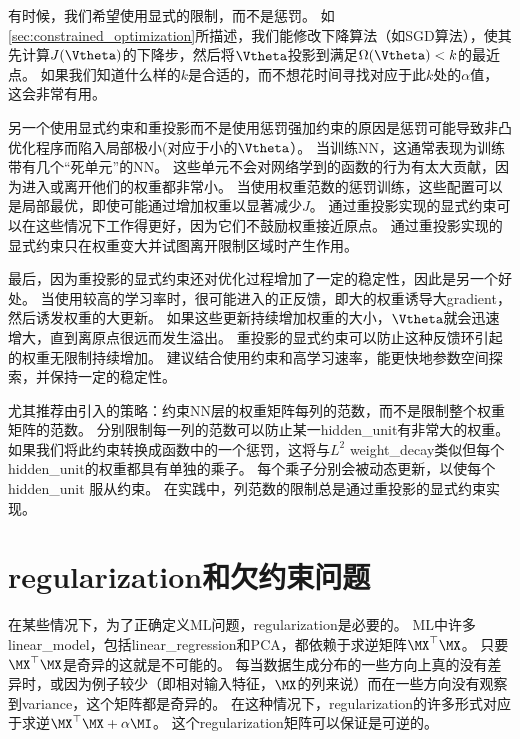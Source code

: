 
有时候，我们希望使用显式的限制，而不是惩罚。
如\ref{sec:constrained_optimization}所描述，我们能修改下降算法（如\gls{SGD}算法），使其先计算$J(\Vtheta)$的下降步，然后将$\Vtheta$投影到满足$\Omega(\Vtheta) < k$的最近点。
如果我们知道什么样的$k$是合适的，而不想花时间寻找对应于此$k$处的$\alpha$值，这会非常有用。

另一个使用显式约束和重投影而不是使用惩罚强加约束的原因是惩罚可能导致非凸优化程序而陷入局部极小(对应于小的$\Vtheta$）。
当训练\gls{NN}，这通常表现为训练带有几个``死单元''的\gls{NN}。
这些单元不会对网络学到的函数的行为有太大贡献，因为进入或离开他们的权重都非常小。
当使用权重范数的惩罚训练，这些配置可以是局部最优，即使可能通过增加权重以显著减少$J$。
通过重投影实现的显式约束可以在这些情况下工作得更好，因为它们不鼓励权重接近原点。
通过重投影实现的显式约束只在权重变大并试图离开限制区域时产生作用。

最后，因为重投影的显式约束还对优化过程增加了一定的稳定性，因此是另一个好处。
当使用较高的学习率时，很可能进入的正反馈，即大的权重诱导大\gls{gradient}，然后诱发权重的大更新。
如果这些更新持续增加权重的大小，$\Vtheta$就会迅速增大，直到离原点很远而发生溢出。
重投影的显式约束可以防止这种反馈环引起的权重无限制持续增加。
\cite{Hinton-et-al-arxiv2012}建议结合使用约束和高学习速率，能更快地参数空间探索，并保持一定的稳定性。


\cite{Hinton-et-al-arxiv2012}尤其推荐由\cite{Srebro05}引入的策略：约束\gls{NN}层的权重矩阵每列的范数，而不是限制整个权重矩阵的范数。
分别限制每一列的范数可以防止某一\gls{hidden_unit}有非常大的权重。
如果我们将此约束转换成函数中的一个惩罚，这将与$L^2$ \gls{weight_decay}类似但每个\gls{hidden_unit}的权重都具有单独的乘子。
每个乘子分别会被动态更新，以使每个\gls{hidden_unit} 服从约束。
在实践中，列范数的限制总是通过重投影的显式约束实现。

\section{\gls{regularization}和欠约束问题}
\label{sec:regularization_and_under_constrained_problems}
在某些情况下，为了正确定义\gls{ML}问题，\gls{regularization}是必要的。
\gls{ML}中许多\gls{linear_model}，包括\gls{linear_regression}和PCA，都依赖于求逆矩阵$\MX^\top\MX$。
只要$\MX^\top\MX$是奇异的这就是不可能的。
每当数据生成分布的一些方向上真的没有差异时，或因为例子较少（即相对输入特征，$\MX$的列来说）而在一些方向没有观察到\gls{variance}，这个矩阵都是奇异的。
在这种情况下，\gls{regularization}的许多形式对应于求逆$\MX^\top\MX + \alpha \MI$。
这个\gls{regularization}矩阵可以保证是可逆的。

